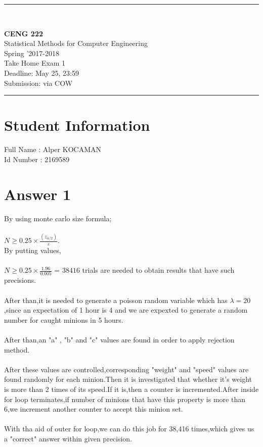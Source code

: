 \documentclass[12pt]{article}
\newcommand{\HRule}{\rule{\linewidth}{1mm}}
\begin{document}
\noindent
\HRule \\[3mm]
\begin{flushright}

                                         \LARGE \textbf{CENG 222}  \\[4mm]
                                         \Large Statistical Methods for Computer Engineering \\[4mm]
                                        \normalsize      Spring '2017-2018 \\
                                           \Large   Take Home Exam 1 \\
                    \normalsize Deadline: May 25, 23:59 \\
                    \normalsize Submission: via COW
\end{flushright}
\HRule

\section*{Student Information }
Full Name : Alper KOCAMAN \\
Id Number :  2169589\\

\section*{Answer 1}

By using monte carlo size formula;\\\\
$N\geq0.25\times\frac{(z_{\alpha/2})}{\varepsilon}$.\\
By putting values,\\\\
$N\geq0.25\times\frac{1.96}{0.005}$ = $38416$ trials are needed to obtain results that have such precisions.\\\\
After than,it is needed to generate a poisson random variable which has $\lambda=20$,since an expectation of 1 hour is 4 and we are expexted to generate a random number for caught minions in 5 hours.\\\\
After than,an "a" , "b" and "c" values are found in order to apply rejection method.\\\\
After these values are controlled,corresponding "weight" and "speed" values are found randomly for each minion.Then it is investigated that whether it's weight is more than 2 times of its speed.If it is,then a counter is incremented.After inside for loop terminates,if number of minions that have this property is more than 6,we increment another counter to accept this minion set.\\\\
With tha aid of outer for loop,we can do this job for 38,416 times,which gives us a "correct" answer within given precision. 
\end{document}
